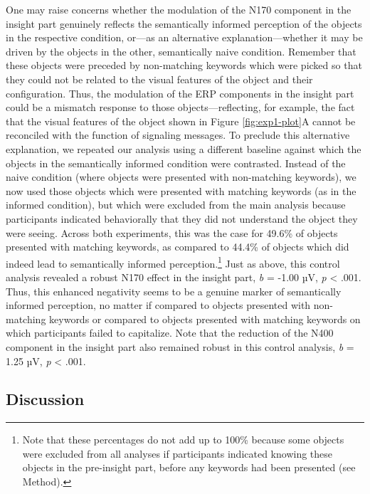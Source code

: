 \documentclass[
  english,
  doc,12pt,twoside,floatsintext]{apa7}
\begin{document}
One may raise concerns whether the modulation of the N170 component in the insight part genuinely reflects the semantically informed perception of the objects in the respective condition, or---as an alternative explanation---whether it may be driven by the objects in the other, semantically naive condition. Remember that these objects were preceded by non-matching keywords which were picked so that they could not be related to the visual features of the object and their configuration. Thus, the modulation of the ERP components in the insight part could be a mismatch response to those objects---reflecting, for example, the fact that the visual features of the object shown in Figure \ref{fig:exp1-plot}A cannot be reconciled with the function of signaling messages. To preclude this alternative explanation, we repeated our analysis using a different baseline against which the objects in the semantically informed condition were contrasted. Instead of the naive condition (where objects were presented with non-matching keywords), we now used those objects which were presented with matching keywords (as in the informed condition), but which were excluded from the main analysis because participants indicated behaviorally that they did not understand the object they were seeing. Across both experiments, this was the case for 49.6\% of objects presented with matching keywords, as compared to 44.4\% of objects which did indeed lead to semantically informed perception.\footnote{Note that these percentages do not add up to 100\% because some objects were excluded from all analyses if participants indicated knowing these objects in the pre-insight part, before any keywords had been presented (see Method).} Just as above, this control analysis revealed a robust N170 effect in the insight part, \emph{b} = -1.00 µV, \emph{p} \textless{} .001. Thus, this enhanced negativity seems to be a genuine marker of semantically informed perception, no matter if compared to objects presented with non-matching keywords or compared to objects presented with matching keywords on which participants failed to capitalize. Note that the reduction of the N400 component in the insight part also remained robust in this control analysis, \emph{b} = 1.25 µV, \emph{p} \textless{} .001.

\hypertarget{discussion-1}{%
\subsection{Discussion}\label{discussion-1}}
\end{document}
